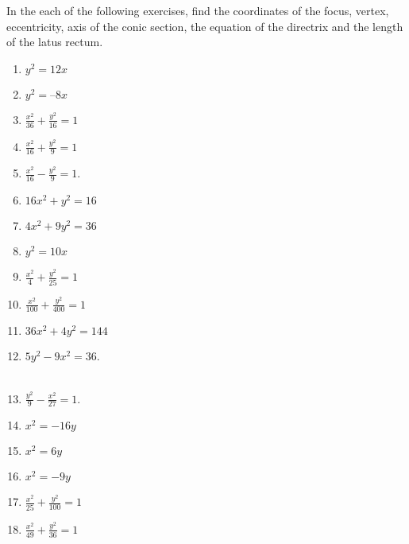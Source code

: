 In the each of the following exercises, find the coordinates of the focus, vertex, eccentricity, axis of the conic section, the equation of the directrix and the length of the latus rectum.
\begin{enumerate}[label=\thesubsection.\arabic*,ref=\thesubsection.\theenumi]
\item $y^2=12x$ 
\label{chapters/11/11/2/1}
\\
\solution

\item 
$y^2 = –8x$
  \item $\frac{x^2}{36}+\frac{y^2}{16}=1$
\\
\solution

  \item $\frac{x^2}{16}+\frac{y^2}{9}=1$
	\item $\frac{x^2}{16}-\frac{y^2}{9} = 1$. \\ 
		\solution
		
\begin{table}[H]
\centering
\caption{}
\label{tab:std-conic-params-sol}
\resizebox{\columnwidth}{!}{%
		
		}
\end{table}
  \item $16x^2+y^2=16$
  \item $4x^2+9y^2=36$
\item $y^2=10x$  
  \item $\frac{x^2}{4}+\frac{y^2}{25}=1$
\\
\solution

\begin{table}[H]
\centering
\caption{}
\label{tab:rot-conic-params-sol}
\resizebox{\columnwidth}{!}{%
		
		}
\end{table}
  \item $\frac{x^2}{100}+\frac{y^2}{400}=1$
  \item $36x^2+4y^2=144$
	\item $5{y^2}-9{x^2}=36$.
		\\
		\solution
		\\
		
	\item $\frac{y^2}{9}-\frac{x^2}{27}=1$.
\item $x^2=-16y$
\\
\solution

\item $x^2=6y$ 
\item $x^2=-9y$  
  \item $\frac{x^2}{25}+\frac{y^2}{100}=1$
  \item $\frac{x^2}{49}+\frac{y^2}{36}=1$
\end{enumerate}

